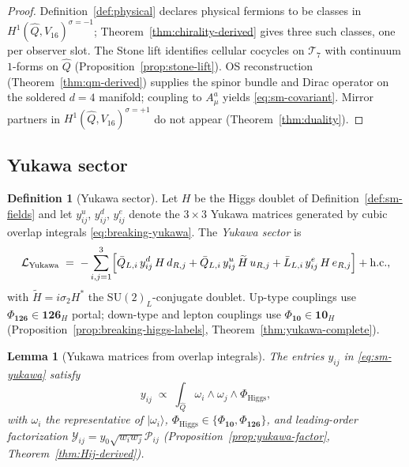 \documentclass[aps,prd,onecolumn,amsmath,amssymb,nofootinbib,11pt]{revtex4-2}
\numberwithin{equation}{section}
\theoremstyle{plain}
\newtheorem{lemma}[theorem]{Lemma}
\theoremstyle{definition}
\newtheorem{definition}[theorem]{Definition}
\theoremstyle{remark}
\begin{document}
\begin{proof}
Definition~\ref{def:physical} declares physical fermions to be classes in
$H^1(\hat Q,V_{16})^{\sigma=-1}$; Theorem~\ref{thm:chirality-derived} gives
three such classes, one per observer slot. The Stone lift identifies cellular
cocycles on $\mathcal{T}_7$ with continuum $1$-forms on $\hat Q$
(Proposition~\ref{prop:stone-lift}). OS reconstruction
(Theorem~\ref{thm:qm-derived}) supplies the spinor bundle and Dirac operator on
the soldered $d=4$ manifold; coupling to $A_\mu^a$ yields \eqref{eq:sm-covariant}.
Mirror partners in $H^1(\hat Q,V_{16})^{\sigma=+1}$ do not appear
(Theorem~\ref{thm:duality}).
\end{proof}

\subsection{Yukawa sector}
\label{sec:sm-lagrangian:yukawa}

\begin{definition}[Yukawa sector]\label{def:sm-yukawa}
Let $H$ be the Higgs doublet of Definition~\ref{def:sm-fields} and let
$y_{ij}^{u}$, $y_{ij}^{d}$, $y_{ij}^{e}$ denote the $3\times3$ Yukawa matrices
generated by cubic overlap integrals \eqref{eq:breaking-yukawa}. The
\emph{Yukawa sector} is
\begin{equation}\label{eq:sm-yukawa}
  \mathcal{L}_{\mathrm{Yukawa}}
  \;=\;
  -\sum_{i,j=1}^{3}
  \Bigl[
    \bar Q_{L,i}\,y_{ij}^{d}\,H\,d_{R,j}
    + \bar Q_{L,i}\,y_{ij}^{u}\,\widetilde{H}\,u_{R,j}
    + \bar L_{L,i}\,y_{ij}^{e}\,H\,e_{R,j}
  \Bigr]
  + \mathrm{h.c.},
\end{equation}
with $\widetilde{H}=i\sigma_2 H^*$ the $\mathrm{SU}(2)_L$-conjugate doublet.
Up-type couplings use $\Phi_{\mathbf{126}}\in\mathbf{126}_H$ portal;
down-type and lepton couplings use $\Phi_{\mathbf{10}}\in\mathbf{10}_H$
(Proposition~\ref{prop:breaking-higgs-labels}, Theorem~\ref{thm:yukawa-complete}).
\end{definition}

\begin{lemma}[Yukawa matrices from overlap integrals]
\label{lem:sm-yukawa-derived}
The entries $y_{ij}$ in \eqref{eq:sm-yukawa} satisfy
\begin{equation}\label{eq:sm-yukawa-overlap}
  y_{ij}
  \;\propto\;
  \int_{\hat Q}\omega_i\wedge\omega_j\wedge\Phi_{\mathrm{Higgs}},
\end{equation}
with $\omega_i$ the representative of $|\omega_i\rangle$,
$\Phi_{\mathrm{Higgs}}\in\{\Phi_{\mathbf{10}},\Phi_{\mathbf{126}}\}$, and
leading-order factorization
$\mathcal{Y}_{ij}=y_0\sqrt{w_iw_j}\mathcal{P}_{ij}$
(Proposition~\ref{prop:yukawa-factor}, Theorem~\ref{thm:Hij-derived}).
\end{lemma}
\end{document}
